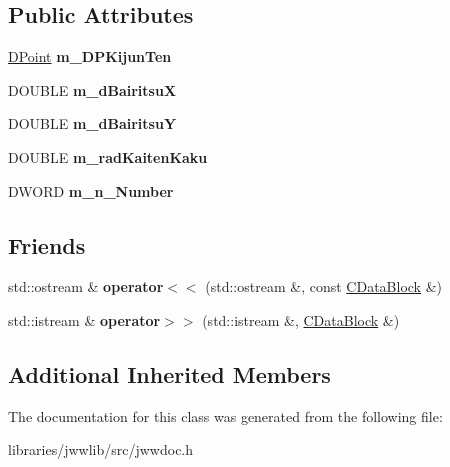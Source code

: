 \subsection*{Public Attributes}
\begin{DoxyCompactItemize}
\item 
\hypertarget{classCDataBlock_a2267d187bf456b38f36e18eae556a691}{\hyperlink{struct__DPoint}{D\-Point} {\bfseries m\-\_\-\-D\-P\-Kijun\-Ten}}\label{classCDataBlock_a2267d187bf456b38f36e18eae556a691}

\item 
\hypertarget{classCDataBlock_a317aea80e76de5090fba5717ff9b7ee4}{D\-O\-U\-B\-L\-E {\bfseries m\-\_\-d\-Bairitsu\-X}}\label{classCDataBlock_a317aea80e76de5090fba5717ff9b7ee4}

\item 
\hypertarget{classCDataBlock_a2c6437df9b22747968c3a5db7e3faedc}{D\-O\-U\-B\-L\-E {\bfseries m\-\_\-d\-Bairitsu\-Y}}\label{classCDataBlock_a2c6437df9b22747968c3a5db7e3faedc}

\item 
\hypertarget{classCDataBlock_a8374e9745162f4b9f68631e5f7504746}{D\-O\-U\-B\-L\-E {\bfseries m\-\_\-rad\-Kaiten\-Kaku}}\label{classCDataBlock_a8374e9745162f4b9f68631e5f7504746}

\item 
\hypertarget{classCDataBlock_aa85446250912168421c7ccc3790290db}{D\-W\-O\-R\-D {\bfseries m\-\_\-n\-\_\-\-Number}}\label{classCDataBlock_aa85446250912168421c7ccc3790290db}

\end{DoxyCompactItemize}
\subsection*{Friends}
\begin{DoxyCompactItemize}
\item 
\hypertarget{classCDataBlock_acabde666aac6956743b693784c2f0f27}{std\-::ostream \& {\bfseries operator$<$$<$} (std\-::ostream \&, const \hyperlink{classCDataBlock}{C\-Data\-Block} \&)}\label{classCDataBlock_acabde666aac6956743b693784c2f0f27}

\item 
\hypertarget{classCDataBlock_a953d2b88f84480c38de6a86d03621179}{std\-::istream \& {\bfseries operator$>$$>$} (std\-::istream \&, \hyperlink{classCDataBlock}{C\-Data\-Block} \&)}\label{classCDataBlock_a953d2b88f84480c38de6a86d03621179}

\end{DoxyCompactItemize}
\subsection*{Additional Inherited Members}


The documentation for this class was generated from the following file\-:\begin{DoxyCompactItemize}
\item 
libraries/jwwlib/src/jwwdoc.\-h\end{DoxyCompactItemize}
